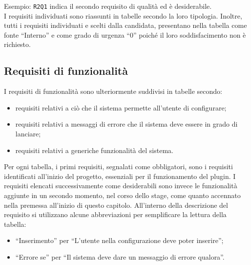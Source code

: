 	Esempio: \texttt{R2Q1} indica il secondo requisito di qualità ed è desiderabile. \\

	I requisiti individuati sono riassunti in tabelle secondo la loro tipologia.
	Inoltre, tutti i requisiti individuati e scelti dalla candidata, presentano nella tabella come fonte ``Interno'' e come grado di urgenza ``0'' poiché il loro soddisfacimento non è richiesto.





	\subsection{Requisiti di funzionalità} \label{requisitiFunzionalita}
	I requisiti di funzionalità sono ulteriormente suddivisi in tabelle secondo:
	\begin{itemize}
		\item requisiti relativi a ciò che il sistema permette all'utente di configurare;
		\item requisiti relativi a messaggi di errore che il sistema deve essere in grado di lanciare;
		\item requisiti relativi a generiche funzionalità del sistema.
	\end{itemize}
	Per ogni tabella, i primi requisiti, segnalati come obbligatori, sono i requisiti identificati all'inizio del progetto, essenziali per il funzionamento del plugin.
	I requisiti elencati successivamente come desiderabili sono invece le funzionalità aggiunte in un secondo momento, nel corso dello stage, come quanto accennato nella premessa all'inizio di questo capitolo.
	All'interno della descrizione del requisito si utilizzano alcune abbreviazioni per semplificare la lettura della tabella:
	\begin{itemize}
		\item ``Inserimento'' per ``L'utente nella configurazione deve poter inserire'';
		\item ``Errore se'' per ``Il sistema deve dare un messaggio di errore qualora''.
	\end{itemize}
		 


